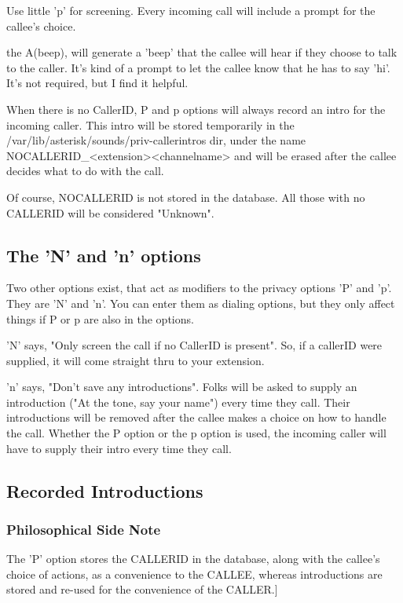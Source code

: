 Use little 'p' for screening. Every incoming call will include a
prompt for the callee's choice. 

the A(beep), will generate a 'beep' that the callee will hear if they
choose to talk to the caller. It's kind of a prompt to let the callee
know that he has to say 'hi'. It's not required, but I find it
helpful.

When there is no CallerID, P and p options will always record an intro
for the incoming caller. This intro will be stored temporarily in the
/var/lib/asterisk/sounds/priv-callerintros dir, under the name
NOCALLERID\_<extension><channelname> and will be erased after the
callee decides what to do with the call.

Of course, NOCALLERID is not stored in the database. All those with no
CALLERID will be considered "Unknown".

\subsection{The 'N' and 'n' options}

Two other options exist, that act as modifiers to the privacy options
'P' and 'p'. They are 'N' and 'n'. You can enter them as dialing
options, but they only affect things if P or p are also in the
options.

'N' says, "Only screen the call if no CallerID is present". So, if a
callerID were supplied, it will come straight thru to your extension.

'n' says, "Don't save any introductions". Folks will be asked to
supply an introduction ("At the tone, say your name") every time they
call. Their introductions will be removed after the callee makes a
choice on how to handle the call. Whether the P option or the p option
is used, the incoming caller will have to supply their intro every
time they call.


\subsection{Recorded Introductions}

\subsubsection{Philosophical Side Note}
The 'P' option stores the CALLERID in the database, along with the
callee's choice of actions, as a convenience to the CALLEE, whereas
introductions are stored and re-used for the convenience of the CALLER.]

